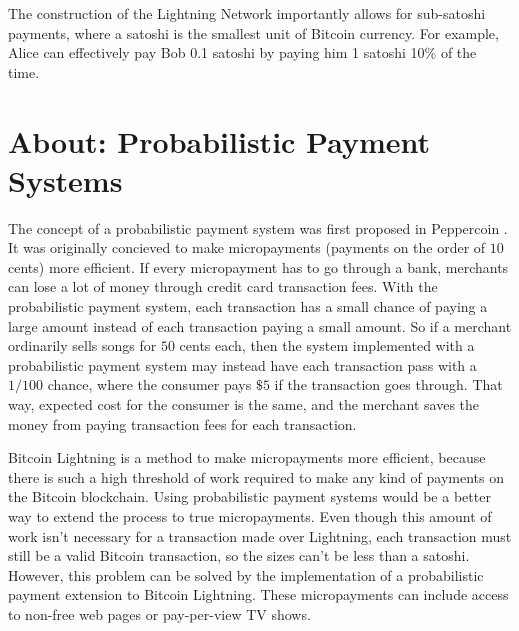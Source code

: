 \documentclass[11pt]{article}
\begin{document}
The construction of the Lightning Network importantly allows for sub-satoshi payments, where a satoshi is the smallest unit of Bitcoin currency. For example, Alice can effectively pay Bob 0.1 satoshi by paying him 1 satoshi 10\% of the time.

\section{About: Probabilistic Payment Systems} %

The concept of a probabilistic payment system was first proposed in Peppercoin \cite{PEPPERCOIN}. It was originally concieved to make micropayments (payments on the order of $10$ cents) more efficient. If every micropayment has to go through a bank, merchants can lose a lot of money through credit card transaction fees. With the probabilistic payment system, each transaction has a small chance of paying a large amount instead of each transaction paying a small amount. So if a merchant ordinarily sells songs for $50$ cents each, then the system implemented with a probabilistic payment system may instead have each transaction pass with a $1/100$ chance, where the consumer pays $\$ 5$ if the transaction goes through. That way, expected cost for the consumer is the same, and the merchant saves the money from paying transaction fees for each transaction.

Bitcoin Lightning is a method to make micropayments more efficient, because there is such a high threshold of work required to make any kind of payments on the Bitcoin blockchain. Using probabilistic payment systems would be a better way to extend the process to true micropayments. Even though this amount of work isn't necessary for a transaction made over Lightning, each transaction must still be a valid Bitcoin transaction, so the sizes can't be less than a satoshi. However, this problem can be solved  by the implementation of a probabilistic payment extension to Bitcoin Lightning. These micropayments can include access to non-free web pages or pay-per-view TV shows.
\end{document}
